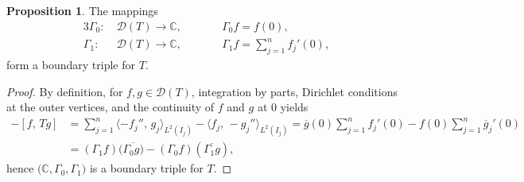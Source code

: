 \documentclass{article}
\numberwithin{equation}{section}
\theoremstyle{definition}
\newtheorem{proposition}[theorem]{Proposition}
\newcommand{\C}{\mathbb{C}}
\newcommand{\mD}{\mathcal{D}}
\newcommand{\scalar}[2]{\langle#1,\, #2\rangle}
\newcommand{\kscalar}[2]{[#1,\, #2]}
\newcommand{\TK}{T}
\begin{document}
\begin{proposition}
   \label{prop:boundarytriplet}
      The mappings
      \begin{alignat*}{3}
      \Gamma_0:~ &\mD(\TK) \to \C,\qquad &&\Gamma_0 f = f(0), \\
      \Gamma_1:~ &\mD(\TK) \to \C,\qquad &&\Gamma_1 f = \sum_{j=1}^n f_j'(0), 
   \end{alignat*}
   form a boundary triple for $\TK$.
\end{proposition}
\begin{proof}
   By definition, for $f,g\in \mD(\TK)$,  integration by parts, Dirichlet conditions at the outer vertices,  and the continuity of $f$ and $g$ at $0$ yields
   \begin{align*}
      \kscalar{\TK f}{g} - \kscalar{f}{\TK g} 
      &= \sum_{j=1}^{n} \scalar{-f_j''}{g_j}_{L^2(I_j)} - \scalar{f_j}{-g_j''}_{L^2(I_j)} 
      = \overline g(0) \sum_{j=1}^{n} f_j'(0) - f(0) \sum_{j=1}^{n} \overline g_j'(0)
      \\
      &= (\Gamma_1 f) (\overline{ \Gamma_0 g)} - (\Gamma_0 f) (\overline{ \Gamma_1 g}),
   \end{align*}
   hence $\bigl(\mathbb{C},\Gamma_0,\Gamma_1\bigr)$  is a boundary triple for $T$. 
\end{proof}
\end{document}
